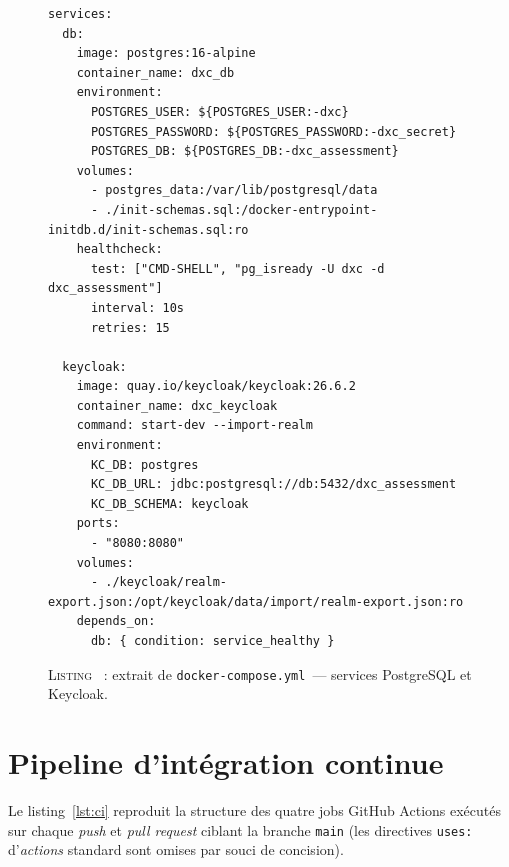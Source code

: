 \documentclass[12pt,a4paper]{report}
\begin{document}
\begin{figure}[H]
\centering
\begin{minipage}{0.95\textwidth}
\begin{verbatim}
services:
  db:
    image: postgres:16-alpine
    container_name: dxc_db
    environment:
      POSTGRES_USER: ${POSTGRES_USER:-dxc}
      POSTGRES_PASSWORD: ${POSTGRES_PASSWORD:-dxc_secret}
      POSTGRES_DB: ${POSTGRES_DB:-dxc_assessment}
    volumes:
      - postgres_data:/var/lib/postgresql/data
      - ./init-schemas.sql:/docker-entrypoint-initdb.d/init-schemas.sql:ro
    healthcheck:
      test: ["CMD-SHELL", "pg_isready -U dxc -d dxc_assessment"]
      interval: 10s
      retries: 15

  keycloak:
    image: quay.io/keycloak/keycloak:26.6.2
    container_name: dxc_keycloak
    command: start-dev --import-realm
    environment:
      KC_DB: postgres
      KC_DB_URL: jdbc:postgresql://db:5432/dxc_assessment
      KC_DB_SCHEMA: keycloak
    ports:
      - "8080:8080"
    volumes:
      - ./keycloak/realm-export.json:/opt/keycloak/data/import/realm-export.json:ro
    depends_on:
      db: { condition: service_healthy }
\end{verbatim}
\end{minipage}
\label{lst:compose}
\caption*{\textsc{Listing \thefigure}~: extrait de \texttt{docker-compose.yml}~--- services PostgreSQL et Keycloak.}
\end{figure}

\section{Pipeline d'intégration continue}
Le listing~\ref{lst:ci} reproduit la structure des quatre jobs GitHub Actions exécutés sur chaque \textit{push} et \textit{pull request} ciblant la branche \texttt{main} (les directives \texttt{uses:} d'\textit{actions} standard sont omises par souci de concision).
\end{document}
